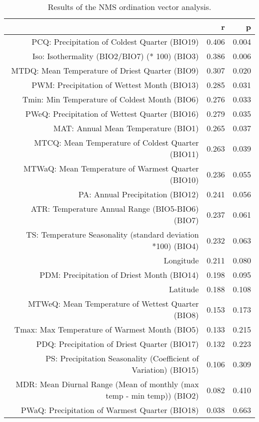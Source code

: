 \begin{table}[ht]
\centering
\begin{tabular}{rrr}
  \hline
 & r & p \\ 
  \hline
PCQ: Precipitation of Coldest Quarter (BIO19) & 0.406 & 0.004 \\ 
  Iso: Isothermality (BIO2/BIO7) (* 100) (BIO3) & 0.386 & 0.006 \\ 
  MTDQ: Mean Temperature of Driest Quarter (BIO9) & 0.307 & 0.020 \\ 
  PWM: Precipitation of Wettest Month (BIO13) & 0.285 & 0.031 \\ 
  Tmin: Min Temperature of Coldest Month (BIO6) & 0.276 & 0.033 \\ 
  PWeQ: Precipitation of Wettest Quarter (BIO16) & 0.279 & 0.035 \\ 
  MAT: Annual Mean Temperature (BIO1) & 0.265 & 0.037 \\ 
  MTCQ: Mean Temperature of Coldest Quarter (BIO11) & 0.263 & 0.039 \\ 
  MTWaQ: Mean Temperature of Warmest Quarter (BIO10) & 0.236 & 0.055 \\ 
  PA: Annual Precipitation (BIO12) & 0.241 & 0.056 \\ 
  ATR: Temperature Annual Range (BIO5-BIO6) (BIO7) & 0.237 & 0.061 \\ 
  TS: Temperature Seasonality (standard deviation *100) (BIO4) & 0.232 & 0.063 \\ 
  Longitude & 0.211 & 0.080 \\ 
  PDM: Precipitation of Driest Month (BIO14) & 0.198 & 0.095 \\ 
  Latitude & 0.188 & 0.108 \\ 
  MTWeQ: Mean Temperature of Wettest Quarter (BIO8) & 0.153 & 0.173 \\ 
  Tmax: Max Temperature of Warmest Month (BIO5) & 0.133 & 0.215 \\ 
  PDQ: Precipitation of Driest Quarter (BIO17) & 0.132 & 0.223 \\ 
  PS: Precipitation Seasonality (Coefficient of Variation) (BIO15) & 0.106 & 0.309 \\ 
  MDR: Mean Diurnal Range (Mean of monthly (max temp - min temp)) (BIO2) & 0.082 & 0.410 \\ 
  PWaQ: Precipitation of Warmest Quarter (BIO18) & 0.038 & 0.663 \\ 
   \hline
\end{tabular}
\caption{Results of the NMS ordination vector analysis.} 
\label{tab:wc_vec}
\end{table}
